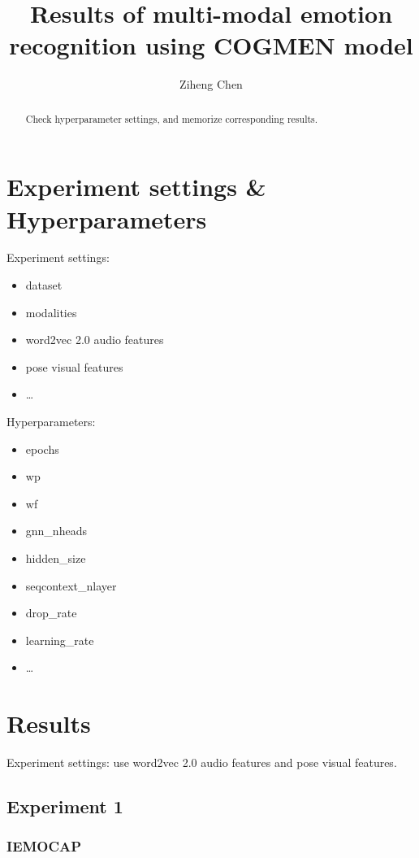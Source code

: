 \documentclass[a4paper]{article}
\title{Results of multi-modal emotion recognition using COGMEN model}
\author{Ziheng Chen}
\begin{document}
    \maketitle

\begin{abstract}
    \large
    Check hyperparameter settings, and memorize corresponding results.
\end{abstract}

\tableofcontents

\section{Experiment settings \& Hyperparameters}
Experiment settings:

\begin{itemize}
    \item dataset
    \item modalities
    \item word2vec 2.0 audio features
    \item pose visual features
    \item \ldots
\end{itemize}

\noindent 
Hyperparameters:

\begin{itemize}
    \item epochs
    \item wp
    \item wf
    \item gnn\_nheads
    \item hidden\_size
    \item seqcontext\_nlayer
    \item drop\_rate
    \item learning\_rate
    \item \ldots
\end{itemize}

\section{Results}
Experiment settings: use word2vec 2.0 audio features and pose visual features.

\subsection{Experiment 1}

\subsubsection{IEMOCAP}
\end{document}
